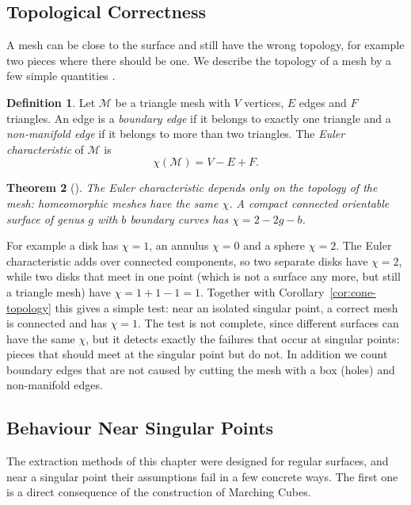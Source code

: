 \documentclass[12pt, a4paper, oneside]{book}
\theoremstyle{plain}
\newtheorem{theorem}{Theorem}[chapter]
\theoremstyle{definition}
\newtheorem{definition}[theorem]{Definition}
\theoremstyle{remark}
\theoremstyle{definition}
\begin{document}
\subsection{Topological Correctness}

A mesh can be close to the surface and still have the wrong topology, for example two pieces where there should be one. We describe the topology of a mesh by a few simple quantities \cite{Botsch,edelsbrunner2010computational}.

\begin{definition}
\label{def:mesh-topology}
Let $\mathcal{M}$ be a triangle mesh with $V$ vertices, $E$ edges and $F$ triangles. An edge is a \emph{boundary edge} if it belongs to exactly one triangle and a \emph{non-manifold edge} if it belongs to more than two triangles. The \emph{Euler characteristic} of $\mathcal{M}$ is
\[
\chi(\mathcal{M})=V-E+F .
\]
\end{definition}

\begin{theorem}[\cite{hatcher2002algebraic,edelsbrunner2010computational}]
\label{thm:euler}
The Euler characteristic depends only on the topology of the mesh: homeomorphic meshes have the same $\chi$. A compact connected orientable surface of genus $g$ with $b$ boundary curves has $\chi=2-2g-b$.
\end{theorem}

For example a disk has $\chi=1$, an annulus $\chi=0$ and a sphere $\chi=2$. The Euler characteristic adds over connected components, so two separate disks have $\chi=2$, while two disks that meet in one point (which is not a surface any more, but still a triangle mesh) have $\chi=1+1-1=1$. Together with Corollary~\ref{cor:cone-topology} this gives a simple test: near an isolated singular point, a correct mesh is connected and has $\chi=1$. The test is not complete, since different surfaces can have the same $\chi$, but it detects exactly the failures that occur at singular points: pieces that should meet at the singular point but do not. In addition we count boundary edges that are not caused by cutting the mesh with a box (holes) and non-manifold edges.

\subsection{Behaviour Near Singular Points}

The extraction methods of this chapter were designed for regular surfaces, and near a singular point their assumptions fail in a few concrete ways. The first one is a direct consequence of the construction of Marching Cubes.
\end{document}
